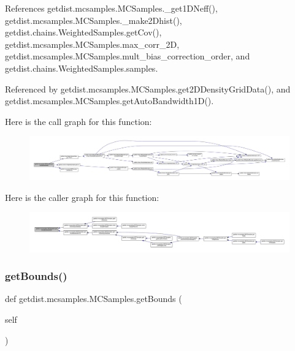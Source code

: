 References getdist.\+mcsamples.\+M\+C\+Samples.\+\_\+get1\+D\+Neff(), getdist.\+mcsamples.\+M\+C\+Samples.\+\_\+make2\+Dhist(), getdist.\+chains.\+Weighted\+Samples.\+get\+Cov(), getdist.\+mcsamples.\+M\+C\+Samples.\+max\+\_\+corr\+\_\+2D, getdist.\+mcsamples.\+M\+C\+Samples.\+mult\+\_\+bias\+\_\+correction\+\_\+order, and getdist.\+chains.\+Weighted\+Samples.\+samples.



Referenced by getdist.\+mcsamples.\+M\+C\+Samples.\+get2\+D\+Density\+Grid\+Data(), and getdist.\+mcsamples.\+M\+C\+Samples.\+get\+Auto\+Bandwidth1\+D().

Here is the call graph for this function\+:
\nopagebreak
\begin{figure}[H]
\begin{center}
\leavevmode
\includegraphics[width=350pt]{classgetdist_1_1mcsamples_1_1MCSamples_a3445486ce2813000c1306234fb2dd6f3_cgraph}
\end{center}
\end{figure}
Here is the caller graph for this function\+:
\nopagebreak
\begin{figure}[H]
\begin{center}
\leavevmode
\includegraphics[width=350pt]{classgetdist_1_1mcsamples_1_1MCSamples_a3445486ce2813000c1306234fb2dd6f3_icgraph}
\end{center}
\end{figure}
\mbox{\label{classgetdist_1_1mcsamples_1_1MCSamples_a3287df7eb2bf02ce8d38a6d307cb2548}} 
\subsubsection{\texorpdfstring{get\+Bounds()}{getBounds()}}
{\footnotesize\ttfamily def getdist.\+mcsamples.\+M\+C\+Samples.\+get\+Bounds (\begin{DoxyParamCaption}\item[{}]{self }\end{DoxyParamCaption})}

